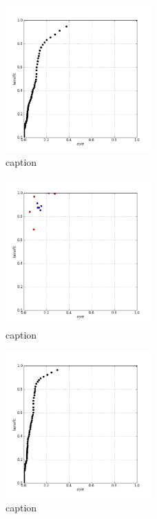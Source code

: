 %
\begin{figure}[!ht]
	\centering
	\includegraphics[width=0.5\textwidth]{img/p1figs/computeFrameStateMagnitudeOnly_sectionCompareBetter_smooth12_tol24_AUC.png}
	\caption{caption}
\end{figure}
%
\begin{figure}[!ht]
	\centering
	\includegraphics[width=0.5\textwidth]{img/p1figs/computeFrameStateMagnitudeOnly_sectionCompareBetter_smooth12_tol48.png}
	\caption{caption}
\end{figure}
%
\begin{figure}[!ht]
	\centering
	\includegraphics[width=0.5\textwidth]{img/p1figs/computeFrameStateMagnitudeOnly_sectionCompareBetter_smooth12_tol48_AUC.png}
	\caption{caption}
\end{figure}
